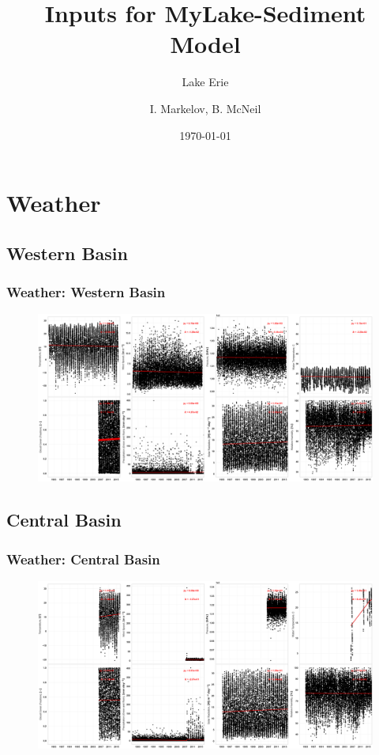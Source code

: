 \documentclass{beamer}
\title{Inputs for MyLake-Sediment Model}
\subtitle{Lake Erie}
\author{I. Markelov, B. McNeil}
\institute{Ecohydrology}
\date{\today}
\begin{document}
\begin{frame}
\titlepage
\end{frame}


\begin{frame}
\begin{multicols}{2}
\tableofcontents
\end{multicols}
\end{frame}

\section{Weather}
\label{sec:weather}

\subsection{Western Basin}
\label{sub:wes}

\begin{frame}
\frametitle{Weather: Western Basin}
\begin{figure}
\includegraphics[width=\textwidth]{weather/western basin weather.png}
\end{figure}
\end{frame}

\subsection{Central Basin}
\label{sub:cen}

\begin{frame}
\frametitle{Weather: Central Basin}
\begin{figure}
\includegraphics[width=\textwidth]{weather/central basin weather.png}
\end{figure}
\end{frame}
\end{document}
